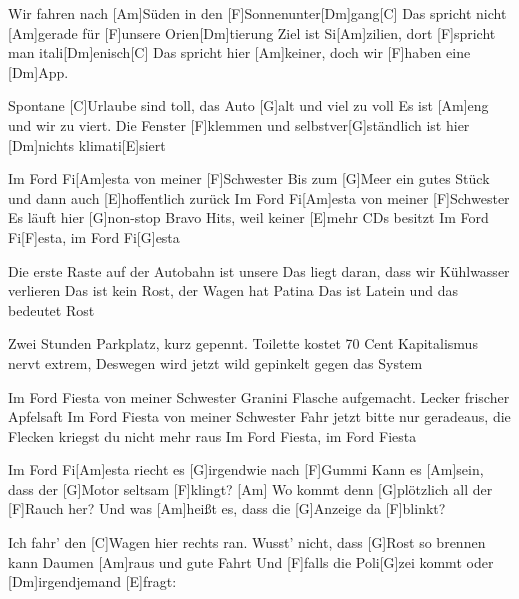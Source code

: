 

\begin{guitar}
	Wir fahren nach [Am]Süden in den [F]Sonnenunter[Dm]gang[C]{}
	Das spricht nicht [Am]gerade für [F]unsere Orien[Dm]tierung
	Ziel ist Si[Am]zilien, dort [F]spricht man itali[Dm]enisch[C]{}
	Das spricht hier [Am]keiner, doch wir [F]haben eine [Dm]App.
	
	Spontane [C]Urlaube sind toll, das Auto [G]alt und viel zu voll
	Es ist [Am]eng und wir zu viert.
	Die Fenster [F]klemmen und selbstver[G]ständlich ist hier [Dm]nichts klimati[E]siert
	
	\begin{highlightbar}
		Im Ford Fi[Am]esta von meiner [F]Schwester
		Bis zum [G]Meer ein gutes Stück und dann auch [E]hoffentlich zurück
		Im Ford Fi[Am]esta von meiner [F]Schwester
		Es läuft hier [G]non-stop Bravo Hits, weil keiner [E]mehr CDs besitzt
		Im Ford Fi[F]esta, im Ford Fi[G]esta
	\end{highlightbar}
	
	\songsection{Strophe 2}
	Die erste Raste auf der Autobahn ist unsere
	Das liegt daran, dass wir Kühlwasser verlieren
	Das ist kein Rost, der Wagen hat Patina
	Das ist Latein und das bedeutet Rost
	
	\songsection{Vorrefrain 2}
	Zwei Stunden Parkplatz, kurz gepennt. Toilette kostet 70 Cent
	Kapitalismus nervt extrem,
	Deswegen wird jetzt wild gepinkelt gegen das System
	
	\begin{highlightbar}
		\songsection{Refrain 2}
		Im Ford Fiesta von meiner Schwester
		Granini Flasche aufgemacht. Lecker frischer Apfelsaft
		Im Ford Fiesta von meiner Schwester
		Fahr jetzt bitte nur geradeaus, die Flecken kriegst du nicht mehr raus
		Im Ford Fiesta, im Ford Fiesta
	\end{highlightbar}
	
	Im Ford Fi[Am]esta riecht es [G]irgendwie nach [F]Gummi
	Kann es [Am]sein, dass der [G]Motor seltsam [F]klingt?
	[Am] Wo kommt denn [G]plötzlich all der [F]Rauch her?
	Und was [Am]heißt es, dass die [G]Anzeige da [F]blinkt?
	
	Ich fahr' den [C]Wagen hier rechts ran. Wusst' nicht, dass [G]Rost so brennen kann
	Daumen [Am]raus und gute Fahrt
	Und [F]falls die Poli[G]zei kommt oder [Dm]irgendjemand [E]fragt:
	

\end{guitar}
